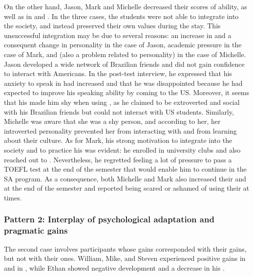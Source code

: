 \documentclass[output=paper]{langsci/langscibook}
\begin{document}
On the other hand, Jason, Mark and Michelle decreased their scores of  ability, as well as in  and . In the three cases, the students were not able to integrate into the  society, and instead preserved their own  values during the stay. This unsuccessful integration may be due to several reasons: an increase in  and a consequent change in personality in the case of Jason, academic pressure in the case of Mark, and  (also a problem related to personality) in the case of Michelle. Jason developed a wide network of Brazilian friends and did not gain confidence to interact with Americans. In the post-test interview, he expressed that his anxiety to speak in  had increased and that he was disappointed because he had expected to improve his speaking ability by coming to the US. Moreover, it seems that his  made him shy when using , as he claimed to be extroverted and social with his Brazilian friends but could not interact with US students. Similarly, Michelle was aware that she was a shy person, and according to her, her introverted personality prevented her from interacting with  and from learning about their culture. As for Mark, his strong motivation to integrate into the society and to practice his  was evident: he enrolled in university clubs and also reached out to . Nevertheless, he regretted feeling a lot of pressure to pass a TOEFL test at the end of the semester that would enable him to continue in the SA program. As a consequence, both Michelle and Mark also increased their  and at the end of the semester and reported being scared or ashamed of using their  at times.


\subsubsection{Pattern 2: Interplay of psychological adaptation and pragmatic gains}
\largerpage
The second case involves participants whose  gains corresponded with their  gains, but not with their  ones. Wil\-liam, Mike, and Steven experienced positive gains in  and in , while Ethan showed negative  development and a decrease in his .
\end{document}
